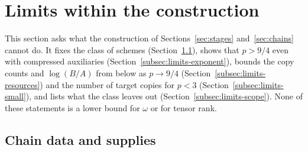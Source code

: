 \section{Limits within the construction}
\label{sec:limits}

This section asks what the construction of
Sections~\ref{sec:stages} and~\ref{sec:chains} cannot do. It fixes the
class of schemes (Section~\ref{subsec:limits-class}), shows that
\(p>9/4\) even with compressed auxiliaries
(Section~\ref{subsec:limits-exponent}), bounds the copy counts and
\(\log(B/A)\) from below as \(p\to9/4\)
(Section~\ref{subsec:limits-resources}) and the number of target copies
for \(p<3\) (Section~\ref{subsec:limits-small}), and lists what the
class leaves out (Section~\ref{subsec:limits-scope}). None of these
statements is a lower bound for \(\omega\) or for tensor rank.

\subsection{Chain data and supplies}
\label{subsec:limits-class}

